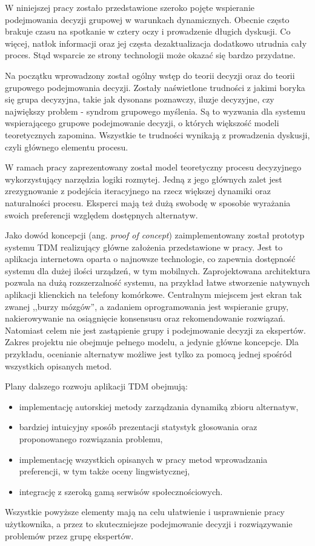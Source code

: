 W niniejszej pracy zostało przedstawione szeroko pojęte wspieranie podejmowania
decyzji grupowej w warunkach dynamicznych. Obecnie często brakuje
czasu na spotkanie w cztery oczy i prowadzenie długich dyskusji. Co więcej,
natłok informacji oraz jej częsta dezaktualizacja dodatkowo utrudnia cały
proces. Stąd wsparcie ze strony technologii może okazać się bardzo przydatne.

Na początku wprowadzony został ogólny wstęp do teorii decyzji oraz do teorii
grupowego podejmowania decyzji. Zostały naświetlone trudności z jakimi boryka
się grupa decyzyjna, takie jak dysonans poznawczy, iluzje decyzyjne, czy
największy problem - syndrom grupowego myślenia. Są to wyzwania dla systemu
wspierającego grupowe podejmowanie decyzji, o których większość modeli
teoretycznych zapomina. Wszystkie te trudności wynikają z prowadzenia dyskusji,
czyli głównego elementu procesu.

W ramach pracy zaprezentowany został model teoretyczny procesu decyzyjnego
wykorzystujący narzędzia logiki rozmytej. Jedną z jego głównych zalet jest
zrezygnowanie z podejścia iteracyjnego na rzecz większej dynamiki oraz
naturalności procesu. Eksperci mają też dużą swobodę w sposobie wyrażania swoich
preferencji względem dostępnych alternatyw.

Jako dowód koncepcji (ang. \textit{proof of concept}) zaimplementowany został
prototyp systemu TDM realizujący główne założenia przedstawione w pracy. Jest to
aplikacja internetowa oparta o najnowsze technologie, co zapewnia dostępność
systemu dla dużej ilości urządzeń, w tym mobilnych. Zaprojektowana
architektura pozwala na dużą rozszerzalność systemu, na przykład łatwe
stworzenie natywnych aplikacji klienckich na telefony komórkowe. Centralnym
miejscem jest ekran tak zwanej ,,burzy mózgów'', a zadaniem oprogramowania jest
wspieranie grupy, nakierowywanie na osiągnięcie konsensusu oraz rekomendowanie
rozwiązań. Natomiast celem nie jest zastąpienie grupy i podejmowanie decyzji za
ekspertów. Zakres projektu nie obejmuje pełnego modelu, a jedynie główne
koncepcje. Dla przykładu, ocenianie alternatyw możliwe jest tylko za pomocą
jednej spośród wszystkich opisanych metod.

Plany dalszego rozwoju aplikacji TDM obejmują:
\begin{itemize}
  \item implementację autorskiej metody zarządzania dynamiką zbioru alternatyw,
  \item bardziej intuicyjny sposób prezentacji statystyk głosowania oraz
  proponowanego rozwiązania problemu,
  \item implementację wszystkich opisanych w pracy metod wprowadzania
  preferencji, w tym także oceny lingwistycznej,
  \item integrację z szeroką gamą serwisów społecznościowych.
\end{itemize}
Wszystkie powyższe elementy mają na celu ułatwienie i usprawnienie pracy
użytkownika, a przez to skuteczniejsze podejmowanie decyzji i rozwiązywanie
problemów przez grupę ekspertów.


